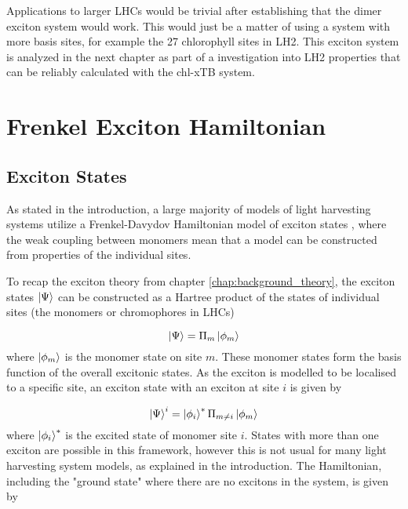 Applications to larger LHCs would be trivial after establishing that the dimer exciton
system would work. This would just be a matter of using a system with more basis
sites, for example the 27 chlorophyll sites in LH2. This exciton system is analyzed
in the next chapter as part of a investigation into LH2 properties that can be reliably
calculated with the chl-xTB system.

\section{Frenkel Exciton Hamiltonian}
\label{sec:exciton_theory}

\subsection{Exciton States}
\label{subsec:exciton_states}
As stated in the introduction, a large majority of models of light harvesting systems
utilize a Frenkel-Davydov Hamiltonian model of exciton states \cite{Curutchet2016, Cignoni2022}, 
where the weak coupling between monomers mean that a model can be constructed from
properties of the individual sites.

To recap the exciton theory from chapter \ref{chap:background_theory}, the exciton 
states $\ket{\Psi}$ can be constructed as a Hartree product of the states of individual 
sites (the monomers or chromophores in LHCs)

\begin{equation}
    \ket{\Psi} = \Pi_m \ket{\phi_m}
\end{equation}
%
where $\ket{\phi_m}$ is the monomer state on site $m$. These monomer states form
the basis function of the overall excitonic states. As the exciton is modelled to
be localised to a specific site, an exciton state with an exciton at site $i$ is
given by

\begin{equation}
    \ket{\Psi}^i = \ket{\phi_i}^\ast \Pi_{m \neq i}  \ket{\phi_m}
\end{equation}
%
where $\ket{\phi_i}^\ast$ is the excited state of monomer site $i$. States with 
more than one exciton are possible in this framework, however this is not usual 
for many light harvesting system models, as explained in the introduction. The Hamiltonian, 
including the "ground state" where there are no excitons in the system, is given 
by

